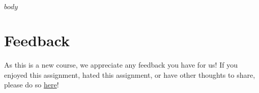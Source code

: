 \documentclass{article}
\begin{document}
$body$

\section*{Feedback}

As this is a new course, we appreciate any feedback you have for us! If you enjoyed this assignment, hated this assignment, or have other thoughts to share, please do so \href{https://forms.gle/VPwUWmVv68v1JVh4A}{here}!
\end{document}
